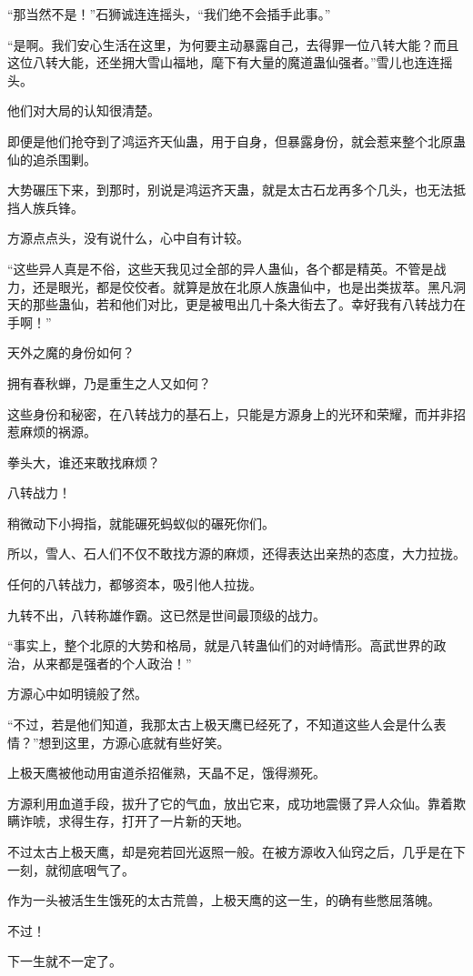 \begin{this_body}
“那当然不是！”石狮诚连连摇头，“我们绝不会插手此事。”

“是啊。我们安心生活在这里，为何要主动暴露自己，去得罪一位八转大能？而且这位八转大能，还坐拥大雪山福地，麾下有大量的魔道蛊仙强者。”雪儿也连连摇头。

他们对大局的认知很清楚。

即便是他们抢夺到了鸿运齐天仙蛊，用于自身，但暴露身份，就会惹来整个北原蛊仙的追杀围剿。

大势碾压下来，到那时，别说是鸿运齐天蛊，就是太古石龙再多个几头，也无法抵挡人族兵锋。

方源点点头，没有说什么，心中自有计较。

“这些异人真是不俗，这些天我见过全部的异人蛊仙，各个都是精英。不管是战力，还是眼光，都是佼佼者。就算是放在北原人族蛊仙中，也是出类拔萃。黑凡洞天的那些蛊仙，若和他们对比，更是被甩出几十条大街去了。幸好我有八转战力在手啊！”

天外之魔的身份如何？

拥有春秋蝉，乃是重生之人又如何？

这些身份和秘密，在八转战力的基石上，只能是方源身上的光环和荣耀，而并非招惹麻烦的祸源。

拳头大，谁还来敢找麻烦？

八转战力！

稍微动下小拇指，就能碾死蚂蚁似的碾死你们。

所以，雪人、石人们不仅不敢找方源的麻烦，还得表达出亲热的态度，大力拉拢。

任何的八转战力，都够资本，吸引他人拉拢。

九转不出，八转称雄作霸。这已然是世间最顶级的战力。

“事实上，整个北原的大势和格局，就是八转蛊仙们的对峙情形。高武世界的政治，从来都是强者的个人政治！”

方源心中如明镜般了然。

“不过，若是他们知道，我那太古上极天鹰已经死了，不知道这些人会是什么表情？”想到这里，方源心底就有些好笑。

上极天鹰被他动用宙道杀招催熟，天晶不足，饿得濒死。

方源利用血道手段，拔升了它的气血，放出它来，成功地震慑了异人众仙。靠着欺瞒诈唬，求得生存，打开了一片新的天地。

不过太古上极天鹰，却是宛若回光返照一般。在被方源收入仙窍之后，几乎是在下一刻，就彻底咽气了。

作为一头被活生生饿死的太古荒兽，上极天鹰的这一生，的确有些憋屈落魄。

不过！

下一生就不一定了。


\end{this_body}
